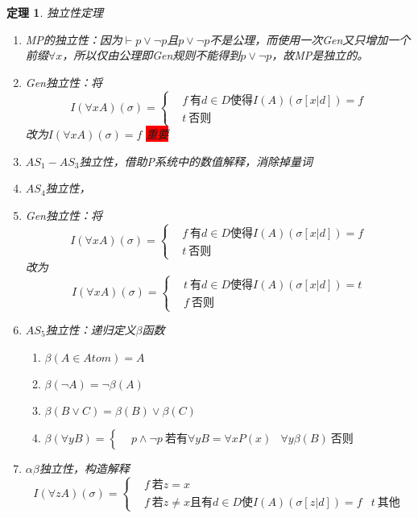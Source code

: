 \documentclass[a4paper]{ctexart}
\newtheorem{thm}{\hspace{2em}定理}[subsection]
\newcommand{\redshade}[1]{\colorbox{red}{#1}}
\begin{document}
\begin{thm}
  独立性定理
  \begin{enumerate}[itemindent=2em]
    \item MP的独立性：因为$\vdash p\vee\neg p$且$p\vee\neg p$不是公理，而使用一次Gen又只增加一个前缀$\forall{x}$，所以仅由公理即Gen规则不能得到$p\vee\neg p$，故MP是独立的。
    \item Gen独立性：将$$
      I(\forall{x}A)(\sigma)=\left\{\begin{aligned}
        &f \ \text{有}d\in D\text{使得}I(A)(\sigma[x|d])=f\\
        &t \ \text{否则}
      \end{aligned}\right.
    $$改为$I(\forall{x}A)(\sigma)=f$ \redshade{重要}
    \item $AS_1-AS_3$独立性，借助P系统中的数值解释，消除掉量词
    \item $AS_4$独立性，\item Gen独立性：将$$
      I(\forall{x}A)(\sigma)=\left\{\begin{aligned}
        &f \ \text{有}d\in D\text{使得}I(A)(\sigma[x|d])=f\\
        &t \ \text{否则}
      \end{aligned}\right.
    $$改为$$
      I(\forall{x}A)(\sigma)=\left\{\begin{aligned}
        &t \ \text{有}d\in D\text{使得}I(A)(\sigma[x|d])=t\\
        &f \ \text{否则}
      \end{aligned}\right.
    $$
    \item $AS_5$独立性：递归定义$\beta$函数
    \begin{enumerate}[itemindent=3em]
      \item $\beta(A\in Atom)=A$
      \item $\beta(\neg A)=\neg\beta(A)$
      \item $\beta(B\vee C)=\beta(B)\vee\beta(C)$
      \item $\beta(\forall{y}B)=\left\{\begin{aligned}
        &p\wedge\neg p\ \text{若有}\forall{y}B=\forall{x}P(x)
        &\forall{y}\beta(B) \ \text{否则}
      \end{aligned}\right.$
    \end{enumerate}
    \item $\alpha\beta$独立性，构造解释$$I(\forall{z}A)(\sigma)=\left\{\begin{aligned}
      &f\ \text{若}z=x \\
      &f\ \text{若}z\neq x \text{且有}d\in D\text{使}I(A)(\sigma[z|d])=f
      &t\ \text{其他}
    \end{aligned}\right.$$
  \end{enumerate}
\end{thm}
\end{document}
